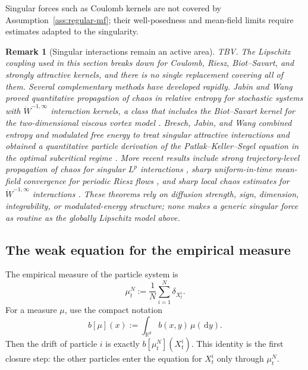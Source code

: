 \documentclass[11pt]{amsart}
\numberwithin{equation}{section}
\theoremstyle{plain}
\newtheorem{remark}[theorem]{Remark}
\newcommand{\R}{\mathbb{R}}
\newcommand{\dd}{\,\mathrm{d}}
\begin{document}
Singular forces such as Coulomb kernels are not covered by
Assumption~\ref{ass:regular-mf}; their well-posedness and mean-field limits
require estimates adapted to the singularity.

\begin{remark}[Singular interactions remain an active area] TBV. 
The Lipschitz coupling used in this section breaks down for Coulomb, Riesz,
Biot--Savart, and strongly attractive kernels, and there is no single
replacement covering all of them.  Several complementary methods have
developed rapidly.  Jabin and Wang proved quantitative propagation of chaos
in relative entropy for stochastic systems with
$\dot W^{-1,\infty}$ interaction kernels, a class that includes the
Biot--Savart kernel for the two-dimensional viscous vortex model
\cite{JabinWang2018}.  Bresch, Jabin, and Wang combined entropy and modulated
free energy to treat singular attractive interactions and obtained a
quantitative particle derivation of the Patlak--Keller--Segel equation in the
optimal subcritical regime \cite{BreschJabinWang2023}.  More recent results
include strong trajectory-level propagation of chaos for singular
$L^p$ interactions \cite{HaoRocknerZhang2024}, sharp uniform-in-time
mean-field convergence for periodic Riesz flows
\cite{ChodronRosenzweigSerfaty2025}, and sharp local chaos estimates for
$\dot W^{-1,\infty}$ interactions \cite{Wang2026}.  These theorems rely on
diffusion strength, sign, dimension, integrability, or modulated-energy
structure; none makes a generic singular force as routine as the globally
Lipschitz model above.
\end{remark}


\subsection{The weak equation for the empirical measure}

The empirical measure of the particle system is
\begin{equation}\label{eq:empirical-measure-time}
    \mu_t^N:=\frac1N\sum_{i=1}^N\delta_{X_t^i}.
\end{equation}
For a measure $\mu$, use the compact notation
\begin{equation}\label{eq:b-mu}
    b[\mu](x):=\int_{\R^d}b(x,y)\,\mu(\dd y).
\end{equation}
Then the drift of particle $i$ is exactly
$b[\mu_t^N](X_t^i)$.  This identity is the first closure step: the other
particles enter the equation for $X_t^i$ only through $\mu_t^N$.
\end{document}

